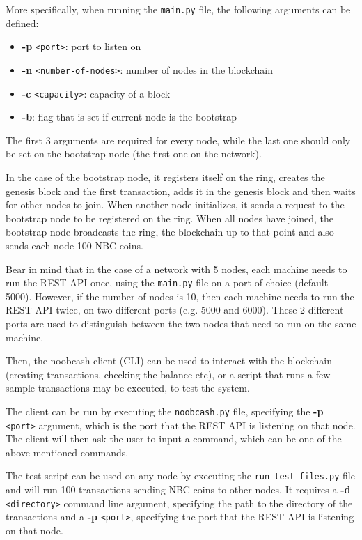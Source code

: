 \documentclass[conference]{IEEEtran}
\begin{document}
More specifically, when running the \verb|main.py| file, the following arguments can be defined:

\begin{itemize}
\item \textbf{-p} \verb|<port>|: port to listen on
\item \textbf{-n} \verb|<number-of-nodes>|: number of nodes in the blockchain
\item \textbf{-c} \verb|<capacity>|: capacity of a block
\item \textbf{-b}: flag that is set if current node is the bootstrap
\end{itemize}

The first 3 arguments are required for every node, while the last one should only be set on the bootstrap node (the first one on the network).

In the case of the bootstrap node, it registers itself on the ring, creates the genesis block and the first transaction, adds it in the genesis block and then waits for other nodes to join. When another node initializes, it sends a request to the bootstrap node to be registered on the ring. When all nodes have joined, the bootstrap node broadcasts the ring, the blockchain up to that point and also sends each node 100 NBC coins.

Bear in mind that in the case of a network with 5 nodes, each machine needs to run the REST API once, using the \verb|main.py| file on a port of choice (default 5000). However, if the number of nodes is 10, then each machine needs to run the REST API twice, on two different ports (e.g. 5000 and 6000). These 2 different ports are used to distinguish between the two nodes that need to run on the same machine.

Then, the noobcash client (CLI) can be used to interact with the blockchain (creating transactions, checking the balance etc), or a script that runs a few sample transactions may be executed, to test the system. 

The client can be run by executing the \verb|noobcash.py| file, specifying the \textbf{-p} \verb|<port>| argument, which is the port that the REST API is listening on that node. The client will then ask the user to input a command, which can be one of the above mentioned commands.

The test script can be used on any node by executing the \verb|run_test_files.py| file and will run 100 transactions sending NBC coins to other nodes. It requires a \textbf{-d} \verb|<directory>| command line argument, specifying the path to the directory of the transactions and a \textbf{-p} \verb|<port>|, specifying the port that the REST API is listening on that node.
\end{document}
